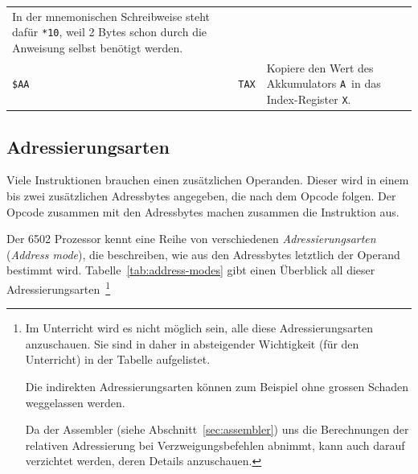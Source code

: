 \documentclass[11pt]{scrartcl}
\newcommand{\xreg}{\texttt{X}}
\newcommand{\acc}{\texttt{A}}
\begin{document}
\begin{longtable}{@{}llp{10cm}@{}}
                                                In der mnemonischen
                                                Schreibweise steht
                                                dafür \texttt{*10}, weil 2
                                                Bytes schon durch die
                                                Anweisung selbst
                                                benötigt werden.\\
    \lstinline!$AA! & \lstinline!TAX! & Kopiere den Wert des
                                        Akkumulators \acc\ in das
                                        Index-Register \xreg. \\
    \bottomrule
  \end{longtable}


\subsection{Adressierungsarten}
\label{sec:address_modes}

Viele Instruktionen brauchen einen zusätzlichen Operanden. Dieser wird
in einem bis zwei zusätzlichen Adressbytes angegeben, die nach dem Opcode
folgen. Der Opcode zusammen mit den Adressbytes machen zusammen die
Instruktion aus.   

Der 6502 Prozessor kennt eine Reihe von verschiedenen
\emph{Adressierungsarten} (\emph{Address mode}), die beschreiben, wie
aus den Adressbytes letztlich der Operand bestimmt wird.
Tabelle~\ref{tab:address-modes} gibt einen Überblick all dieser
Adressierungsarten~\footnote{Im Unterricht wird es nicht möglich
  sein, alle diese Adressierungsarten anzuschauen.  Sie sind in daher
  in absteigender Wichtigkeit (für den Unterricht) in der Tabelle
  aufgelistet.

  Die indirekten Adressierungsarten können zum Beispiel ohne grossen
  Schaden weggelassen werden.

  Da der Assembler (siehe Abschnitt~\ref{sec:assembler}) uns die
  Berechnungen der relativen Adressierung bei Verzweigungsbefehlen
  abnimmt, kann auch darauf verzichtet werden, deren Details
  anzuschauen.}
  
\end{document}
